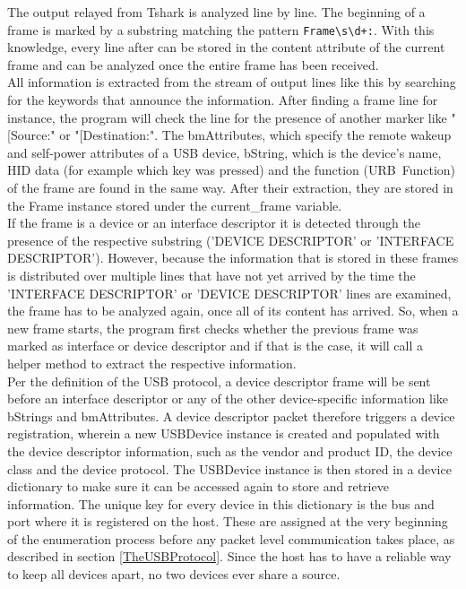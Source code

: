 The output relayed from Tshark is analyzed line by line. The beginning of a frame is marked by a substring matching the pattern \verb|Frame\s\d+:|. With this knowledge, every line after can be stored in the content attribute of the current frame and can be analyzed once the entire frame has been received. \\ 
All information is extracted from the stream of output lines like this by searching for the keywords that announce the information. After finding a frame line for instance, the program will check the line for the presence of another marker like "[Source:" or "[Destination:". The bmAttributes, which specify the remote wakeup and self-power attributes of a USB device, bString, which is the device's name, HID data (for example which key was pressed) and the function (URB\ Function) of the frame are found in the same way. After their extraction, they are stored in the Frame instance stored under the current\_frame variable. \\
If the frame is a device or an interface descriptor it is detected through the presence of the respective substring ('DEVICE DESCRIPTOR' or 'INTERFACE DESCRIPTOR'). However, because the information that is stored in these frames is distributed over multiple lines that have not yet arrived by the time the 'INTERFACE DESCRIPTOR' or 'DEVICE DESCRIPTOR'  lines are examined, the frame has to be analyzed again, once all of its content has arrived. So, when a new frame starts, the program first checks whether the previous frame was marked as interface or device descriptor and if that is the case, it will call a helper method to extract the respective information. \\
Per the definition of the USB protocol, a device descriptor frame will be sent before an interface descriptor or any of the other device-specific information like bStrings and bmAttributes. A device descriptor packet therefore triggers a device registration, wherein a new USBDevice instance is created and populated with the device descriptor information, such as the vendor and product ID, the device class and the device protocol. The USBDevice instance is then stored in a device dictionary to make sure it can be accessed again to store and retrieve information. The unique key for every device in this dictionary is the bus and port where it is registered on the host. These are assigned at the very beginning of the enumeration process before any packet level communication takes place, as described in section \ref{TheUSBProtocol}. Since the host has to have a reliable way to keep all devices apart, no two devices ever share a source. \\
